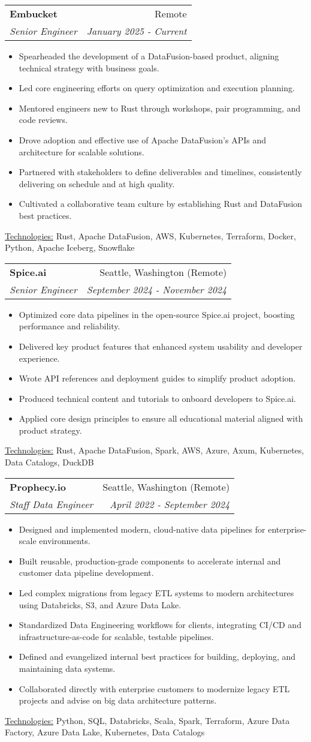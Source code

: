 \documentclass[letterpaper,11pt]{article}
\makeatletter
\newcommand{\resumeItem}[1]{%
  \item\small{
    #1
  }
}
\newcommand{\resumeSubheading}[4]{
  \vspace{8pt}\item%
    \begin{tabular*}{0.97\textwidth}[t]{l@{\extracolsep{\fill}}r}
      \textbf{#1} & #2 \\
      \textit{\small#3} & \textit{\small #4} \\
    \end{tabular*}\vspace{-5pt}
}
\newcommand{\resumeItemListStart}{\begin{itemize}}
\newcommand{\resumeItemListEnd}{\end{itemize}\vspace{-5pt}}
\newcommand{\resumeTech}[2]{
 \underline{#1:} #2
}
\makeatother
\begin{document}
  \resumeSubheading
      {Embucket}{Remote}
      {Senior Engineer}{January 2025 - Current}
      \resumeItemListStart
      \resumeItem{Spearheaded the development of a DataFusion-based product, aligning technical strategy with business goals.}
      \resumeItem{Led core engineering efforts on query optimization and execution planning.}
      \resumeItem{Mentored engineers new to Rust through workshops, pair programming, and code reviews.}
      \resumeItem{Drove adoption and effective use of Apache DataFusion’s APIs and architecture for scalable solutions.}
      \resumeItem{Partnered with stakeholders to define deliverables and timelines, consistently delivering on schedule and at high quality.}
      \resumeItem{Cultivated a collaborative team culture by establishing Rust and DataFusion best practices.}
      \resumeItemListEnd
      \resumeTech{Technologies}{Rust, Apache DataFusion, AWS, Kubernetes, Terraform, Docker, Python, Apache Iceberg, Snowflake}\\

      \resumeSubheading
      {Spice.ai}{Seattle, Washington (Remote)}
      {Senior Engineer}{September 2024 - November 2024}
      \resumeItemListStart
      \resumeItem{Optimized core data pipelines in the open-source Spice.ai project, boosting performance and reliability.}
      \resumeItem{Delivered key product features that enhanced system usability and developer experience.}
      \resumeItem{Wrote API references and deployment guides to simplify product adoption.}
      \resumeItem{Produced technical content and tutorials to onboard developers to Spice.ai.}
      \resumeItem{Applied core design principles to ensure all educational material aligned with product strategy.}
      \resumeItemListEnd
      \resumeTech{Technologies}{Rust, Apache DataFusion, Spark, AWS, Azure, Axum, Kubernetes, Data Catalogs, DuckDB}\\

    \resumeSubheading
      {Prophecy.io}{Seattle, Washington (Remote)}
      {Staff Data Engineer}{April 2022 - September 2024}
      \resumeItemListStart
      \resumeItem{Designed and implemented modern, cloud-native data pipelines for enterprise-scale environments.}
      \resumeItem{Built reusable, production-grade components to accelerate internal and customer data pipeline development.}
      \resumeItem{Led complex migrations from legacy ETL systems to modern architectures using Databricks, S3, and Azure Data Lake.}
      \resumeItem{Standardized Data Engineering workflows for clients, integrating CI/CD and infrastructure-as-code for scalable, testable pipelines.}
      \resumeItem{Defined and evangelized internal best practices for building, deploying, and maintaining data systems.}
      \resumeItem{Collaborated directly with enterprise customers to modernize legacy ETL projects and advise on big data architecture patterns.}
      \resumeItemListEnd
      \resumeTech{Technologies}{Python, SQL, Databricks, Scala, Spark, Terraform, Azure Data Factory, Azure Data Lake, Kubernetes, Data Catalogs}\\
\end{document}
